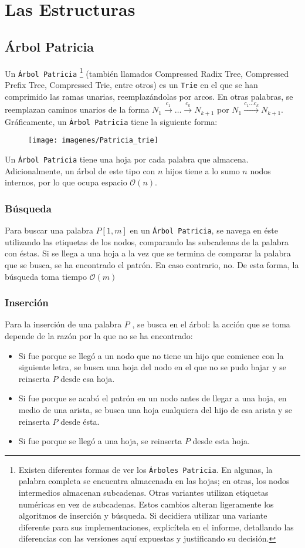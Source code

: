 \documentclass[dcc,uchile]{fcfmcourse}
\begin{document}
\section{Las Estructuras}
\subsection{Árbol Patricia}
Un \texttt{Árbol Patricia} \footnote{Existen diferentes formas de ver los \texttt{Árboles Patricia}. En algunas, la palabra completa se encuentra almacenada en las hojas; en otras, los nodos intermedios almacenan subcadenas. Otras variantes utilizan etiquetas numéricas en vez de subcadenas. Estos cambios alteran ligeramente los algoritmos de inserción y búsqueda. Si decidiera utilizar una variante diferente para sus implementaciones, explicítela en el informe, detallando las diferencias con las versiones aquí expuestas y justificando su decisión.}  (también llamados Compressed Radix Tree, Compressed Prefix Tree, Compressed Trie, entre otros) es un \texttt{Trie} en el que se han comprimido las ramas unarias, reemplazándolas por arcos. En otras palabras, se reemplazan caminos unarios de la forma $N_{1} \stackrel{c_{1}}{\rightarrow}\ldots \stackrel{c_{k}}{\rightarrow} N_{k+1}$  por $N_{1} \stackrel{c_{1}\ldots c_{k}}{\rightarrow} N_{k+1}$. Gráficamente, un \texttt{Árbol Patricia} tiene la siguiente forma:
\begin{figure}[h]
\centering
 	\texttt{[image: imagenes/Patricia\_trie]}
\end{figure}

Un \texttt{Árbol Patricia} tiene una hoja por cada palabra que almacena. Adicionalmente, un árbol de este tipo con $n$ hijos tiene a lo sumo $n$ nodos internos, por lo que ocupa espacio $\mathcal{O}(n)$.
\subsubsection*{Búsqueda}
Para buscar una palabra $P [1, m]$ en un \texttt{Árbol Patricia}, se navega en éste utilizando las etiquetas de los nodos, comparando las subcadenas de la palabra con éstas. Si se llega a una hoja a la vez que se termina de comparar la palabra que se busca, se ha encontrado el patrón. En caso contrario, no. De esta forma, la búsqueda toma tiempo $\mathcal{O}(m)$
\subsubsection*{Inserción}
Para la inserción de una palabra $P$ , se busca en el árbol: la acción que se toma depende de la razón por la que no se ha encontrado:
\begin{itemize}
\item Si fue porque se llegó a un nodo que no tiene un hijo que comience con la siguiente letra, se busca una hoja del nodo en el que no se pudo bajar y se reinserta $P$ desde esa hoja.
\item Si fue porque se acabó el patrón en un nodo antes de llegar a una hoja, en medio de una
arista, se busca una hoja cualquiera del hijo de esa arista y se reinserta $P$ desde ésta.
\item Si fue porque se llegó a una hoja, se reinserta $P$ desde esta hoja.
\end{itemize}
\end{document}
